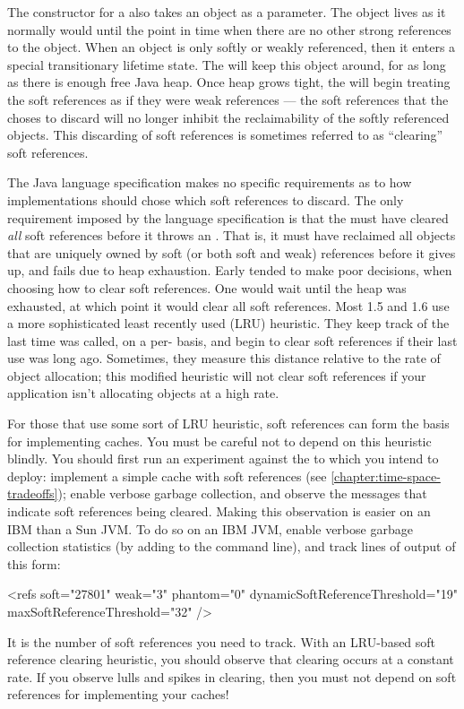 The constructor for a  also takes an object as a parameter.
The object lives as it normally would until the point in time when there are no
other strong references to the object. When an object is only softly or weakly
referenced, then it enters a special transitionary lifetime state. The \jre will
keep this object around, for as long as there is enough free Java heap. Once heap
grows tight, the \jre will begin treating the soft references as if they were
weak references --- the soft references that the \jre choses to discard will no
longer inhibit the reclaimability of the softly referenced objects. This
discarding of soft references is sometimes referred to as ``clearing'' soft
references.

The Java language specification makes no specific requirements as to how \jre
implementations should chose which soft references to discard. The only
requirement imposed by the language specification is that the \jre must have
cleared \emph{all} soft references before it throws an
. That is, it must have reclaimed all objects that
are uniquely owned by soft (or both soft and weak) references before it gives up,
and fails due to heap exhaustion. Early \jres tended to make poor decisions, when
choosing how to clear soft references. One \jre would wait until the heap was
exhausted, at which point it would clear all soft references. Most 1.5 and 1.6
\jres use a more sophisticated least recently used (LRU) heuristic. They keep
track of the last time  was called, on a per-
basis, and begin to clear soft references if their last use was long ago.
Sometimes, they measure this distance relative to the rate of object allocation;
this modified heuristic will not clear soft references if your application isn't
allocating objects at a high rate.

For those \jres that use some sort of LRU heuristic, soft references can form the
basis for implementing caches. You must be careful not to depend on this
heuristic blindly. You should first run an experiment against the \jre to which
you intend to deploy: implement a simple cache with soft references (see
\autoref{chapter:time-space-tradeoffs}); enable verbose garbage collection, and
observe the messages that indicate soft references being cleared. Making this
observation is easier on an IBM than a Sun JVM. To do so on an IBM JVM, enable
verbose garbage collection statistics (by adding  to the
command line), and track lines of output of this form:
\begin{shortlisting}
<refs soft="27801" weak="3" phantom="0" dynamicSoftReferenceThreshold="19" maxSoftReferenceThreshold="32" />
\end{shortlisting}
It is the number of soft references you need to track. With an
LRU-based soft reference clearing heuristic, you should observe that clearing
occurs at a constant rate. If you observe lulls and spikes in clearing, then you
must not depend on soft references for implementing your caches!

